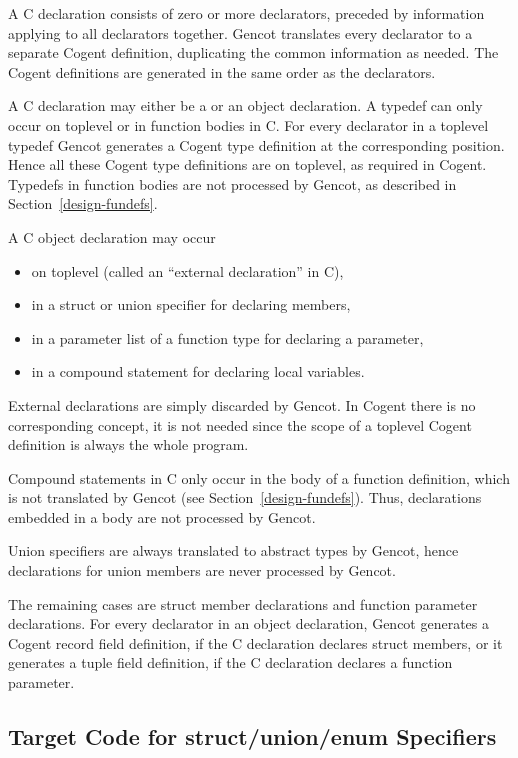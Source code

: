 
A C declaration consists of zero or more declarators, preceded by information applying to all declarators together.
Gencot translates every declarator to a separate Cogent definition, duplicating the common information as needed.
The Cogent definitions are generated in the same order as the declarators.

A C declaration may either be a  or an object declaration. A typedef can only occur on toplevel or 
in function bodies in C.
For every declarator in a toplevel typedef Gencot generates a Cogent type definition at the corresponding position. Hence
all these Cogent type definitions are on toplevel, as required in Cogent. Typedefs in function bodies are not
processed by Gencot, as described in Section~\ref{design-fundefs}.

A C object declaration may occur 
\begin{itemize}
\item on toplevel (called an ``external declaration'' in C),
\item in a struct or union specifier for declaring members,
\item in a parameter list of a function type for declaring a parameter,
\item in a compound statement for declaring local variables.
\end{itemize}

External declarations are simply discarded by Gencot. In Cogent there is no corresponding concept, it is not needed
since the scope of a toplevel Cogent definition is always the whole program. 

Compound statements in C only occur 
in the body of a function definition, which is not translated by Gencot 
(see Section~\ref{design-fundefs}). Thus, declarations embedded in a body are not processed by Gencot.

Union specifiers are always translated to abstract types by Gencot, hence declarations for union members are
never processed by Gencot.

The remaining cases are struct member declarations and function parameter declarations. 
For every declarator in an object declaration, Gencot generates a Cogent record field definition, if the C declaration
declares struct members, or it generates a tuple field definition, if the C declaration declares a function parameter.

\subsection{Target Code for struct/union/enum Specifiers}
\label{design-decls-tags}

